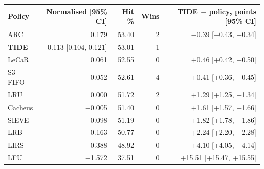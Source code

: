 \begin{tabular}{lrrrr}
\toprule
Policy & Normalised [95\% CI] & Hit \% & Wins & TIDE $-$ policy, points [95\% CI] \\
\midrule
ARC & 0.179 & 53.40 & 2 & $-$0.39 [$-$0.43, $-$0.34] \\
\textbf{TIDE} & 0.113 [0.104, 0.121] & 53.01 & 1 & --- \\
LeCaR & 0.061 & 52.55 & 0 & +0.46 [+0.42, +0.50] \\
S3-FIFO & 0.052 & 52.61 & 4 & +0.41 [+0.36, +0.45] \\
LRU & 0.000 & 51.72 & 2 & +1.29 [+1.25, +1.34] \\
Cacheus & $-$0.005 & 51.40 & 0 & +1.61 [+1.57, +1.66] \\
SIEVE & $-$0.098 & 51.19 & 0 & +1.82 [+1.78, +1.86] \\
LRB & $-$0.163 & 50.77 & 0 & +2.24 [+2.20, +2.28] \\
LIRS & $-$0.388 & 48.92 & 0 & +4.10 [+4.05, +4.14] \\
LFU & $-$1.572 & 37.51 & 0 & +15.51 [+15.47, +15.55] \\
\bottomrule
\end{tabular}
